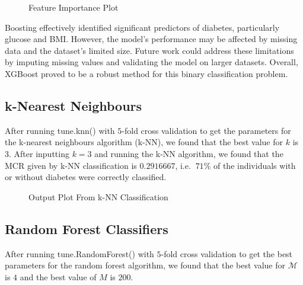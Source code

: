 \documentclass[12pt]{article}
\begin{document}
\begin{figure}[h!]
	\centering
	\caption{Feature Importance Plot}
	\label{fig:importance}
\end{figure}


Boosting effectively identified significant predictors of diabetes, particularly glucose and BMI. However, the model's performance may be affected by missing data and the dataset's limited size. Future work could address these limitations by imputing missing values and validating the model on larger datasets. Overall, XGBoost proved to be a robust method for this binary classification problem.

\subsection{k-Nearest Neighbours}

After running tune.knn() with $5$-fold cross validation to get the parameters for the k-nearest neighbours algorithm (k-NN), we found that the best value for $k$ is $3$. After inputting $k=3$ and running the k-NN algorithm, we found that the MCR given by k-NN classification is $0.2916667$, i.e. $~71\%$ of the individuals with or without diabetes were correctly classified.

\begin{figure}[h!]
	\centering
	\caption{Output Plot From k-NN Classification} 
	\label{fig:KNNPlot}
\end{figure}

\subsection{Random Forest Classifiers}

After running tune.RandomForest() with $5$-fold cross validation to get the best parameters for the random forest algorithm, we found that the best value for $\mathcal{M}$ is $4$ and the best value of $M$ is $200$. 
\end{document}
